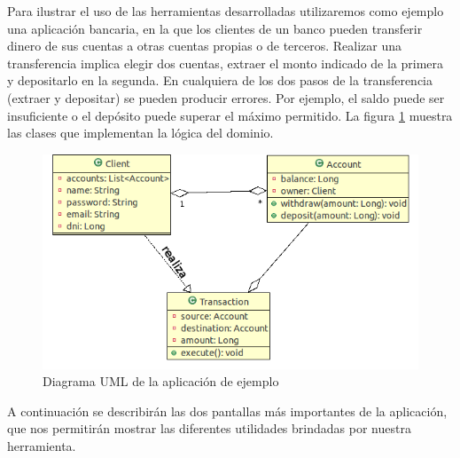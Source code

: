 Para ilustrar el uso de las herramientas desarrolladas utilizaremos como ejemplo
una aplicación bancaria, en la que los clientes de un banco pueden transferir
dinero de sus cuentas a otras cuentas propias o de terceros. 
Realizar una transferencia implica elegir dos cuentas, extraer el
monto indicado de la primera y depositarlo en la segunda. 
En cualquiera de los dos pasos de la transferencia (extraer y depositar) se
pueden producir errores.
Por ejemplo, el saldo puede ser insuficiente o el depósito puede superar el
máximo permitido.
La figura \ref{example} muestra las clases que implementan la lógica del
dominio.

	\begin{figure}[h]
		\centering
		\includegraphics[scale=0.5]{img/transaccion}
		\caption{Diagrama UML de la aplicación de ejemplo}
		\label{example}
	\end{figure}	

A continuación se describirán las dos pantallas más importantes de la
aplicación, que nos permitirán mostrar las diferentes utilidades brindadas por
nuestra herramienta.
 

